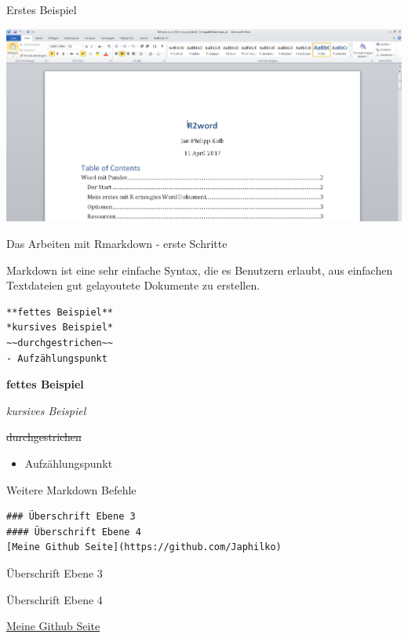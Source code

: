\documentclass[ignorenonframetext,]{beamer}
\providecommand{\tightlist}{%
\setlength{\itemsep}{0pt}\setlength{\parskip}{0pt}}
\begin{document}
\begin{frame}{Erstes Beispiel}

\includegraphics{./tex2pdf.956/f4f53ebbec0e266cea1febc80003dc7c93085030.png}

\end{frame}

\begin{frame}[fragile]{Das Arbeiten mit Rmarkdown - erste Schritte}

Markdown ist eine sehr einfache Syntax, die es Benutzern erlaubt, aus
einfachen Textdateien gut gelayoutete Dokumente zu erstellen.

\begin{verbatim}
**fettes Beispiel**
*kursives Beispiel*
~~durchgestrichen~~
- Aufzählungspunkt
\end{verbatim}

\textbf{fettes Beispiel}

\emph{kursives Beispiel}

\sout{durchgestrichen}

\begin{itemize}
\tightlist
\item
  Aufzählungspunkt
\end{itemize}

\end{frame}

\begin{frame}[fragile]{Weitere Markdown Befehle}

\begin{verbatim}
### Überschrift Ebene 3
#### Überschrift Ebene 4
[Meine Github Seite](https://github.com/Japhilko)
\end{verbatim}

\begin{block}{Überschrift Ebene 3}

\begin{block}{Überschrift Ebene 4}

\href{https://github.com/Japhilko}{Meine Github Seite}

\end{block}

\end{block}

\end{frame}
\end{document}
